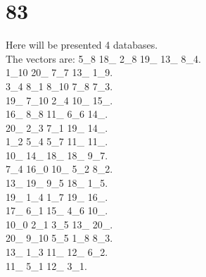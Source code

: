 \chapter{83}
\indent Here will be presented 4 databases.\\
The vectors are:
5\_8 18\_ 2\_8 19\_ 13\_ 8\_4.\\1\_10 20\_ 7\_7 13\_ 1\_9.\\3\_4 8\_1 8\_10 7\_8 7\_3.\\19\_ 7\_10 2\_4 10\_ 15\_.\\16\_ 8\_8 11\_ 6\_6 14\_.\\20\_ 2\_3 7\_1 19\_ 14\_.\\1\_2 5\_4 5\_7 11\_ 11\_.\\10\_ 14\_ 18\_ 18\_ 9\_7.\\7\_4 16\_0 10\_ 5\_2 8\_2.\\13\_ 19\_ 9\_5 18\_ 1\_5.\\19\_ 1\_4 1\_7 19\_ 16\_.\\17\_ 6\_1 15\_ 4\_6 10\_.\\10\_0 2\_1 3\_5 13\_ 20\_.\\20\_ 9\_10 5\_5 1\_8 8\_3.\\13\_ 1\_3 11\_ 12\_ 6\_2.\\11\_ 5\_1 12\_ 3\_1.\\